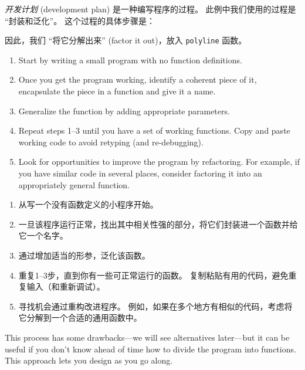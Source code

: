 \emph{开发计划} (development plan) 是一种编写程序的过程。
此例中我们使用的过程是 ``封装和泛化''。 这个过程的具体步骤是：

因此，我们 ``将它分解出来'' (factor it out)，放入 \lstinline{polyline} 函数。

\begin{enumerate}

\item Start by writing a small program with no function definitions.

\item Once you get the program working, identify a coherent piece of
  it, encapsulate the piece in a function and give it a name.

\item Generalize the function by adding appropriate parameters.

\item Repeat steps 1--3 until you have a set of working functions.
Copy and paste working code to avoid retyping (and re-debugging).

\item Look for opportunities to improve the program by refactoring.
For example, if you have similar code in several places, consider
factoring it into an appropriately general function.

\end{enumerate}

\begin{enumerate}

\item 从写一个没有函数定义的小程序开始。

\item 一旦该程序运行正常，找出其中相关性强的部分，将它们封装进一个函数并给它一个名字。

\item 通过增加适当的形参，泛化该函数。

\item 重复1–3步，直到你有一些可正常运行的函数。
   复制粘贴有用的代码，避免重复输入（和重新调试）。

\item 寻找机会通过重构改进程序。
   例如，如果在多个地方有相似的代码，考虑将它分解到一个合适的通用函数中。

\end{enumerate}

This process has some drawbacks---we will see alternatives later---but
it can be useful if you don't know ahead of time how to divide the
program into functions.  This approach lets you design as you go
along.

